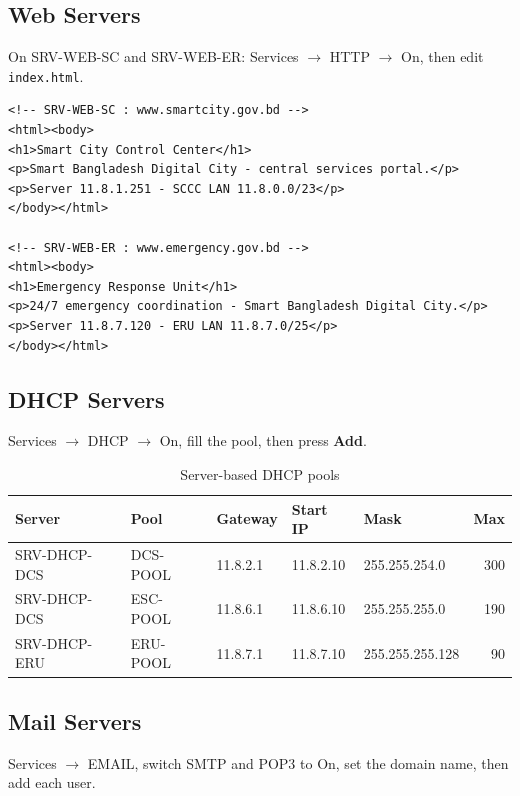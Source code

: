 \documentclass[11pt,a4paper]{article}
\newcommand{\netc}[1]{\texttt{\small #1}}
\begin{document}
\noindent

\subsection{Web Servers}

On SRV-WEB-SC and SRV-WEB-ER: Services $\rightarrow$ HTTP $\rightarrow$ On,
then edit \netc{index.html}.

\begin{lstlisting}[morecomment={[s]{<!--}{-->}}]
<!-- SRV-WEB-SC : www.smartcity.gov.bd -->
<html><body>
<h1>Smart City Control Center</h1>
<p>Smart Bangladesh Digital City - central services portal.</p>
<p>Server 11.8.1.251 - SCCC LAN 11.8.0.0/23</p>
</body></html>

<!-- SRV-WEB-ER : www.emergency.gov.bd -->
<html><body>
<h1>Emergency Response Unit</h1>
<p>24/7 emergency coordination - Smart Bangladesh Digital City.</p>
<p>Server 11.8.7.120 - ERU LAN 11.8.7.0/25</p>
</body></html>
\end{lstlisting}

\subsection{DHCP Servers}

Services $\rightarrow$ DHCP $\rightarrow$ On, fill the pool, then press
\textbf{Add}.

\begin{table}[htbp]
\centering
\caption{Server-based DHCP pools}
\label{tab:dhcpsrv}
\small
\begin{tabular}{@{}lllllr@{}}
\toprule
\textbf{Server} & \textbf{Pool} & \textbf{Gateway} & \textbf{Start IP} &
\textbf{Mask} & \textbf{Max} \\
\midrule
SRV-DHCP-DCS & DCS-POOL & 11.8.2.1 & 11.8.2.10 & 255.255.254.0   & 300 \\
SRV-DHCP-DCS & ESC-POOL & 11.8.6.1 & 11.8.6.10 & 255.255.255.0   & 190 \\
SRV-DHCP-ERU & ERU-POOL & 11.8.7.1 & 11.8.7.10 & 255.255.255.128 & 90 \\
\bottomrule
\end{tabular}
\end{table}

\noindent

\subsection{Mail Servers}

Services $\rightarrow$ EMAIL, switch SMTP and POP3 to On, set the domain
name, then add each user.
\end{document}
